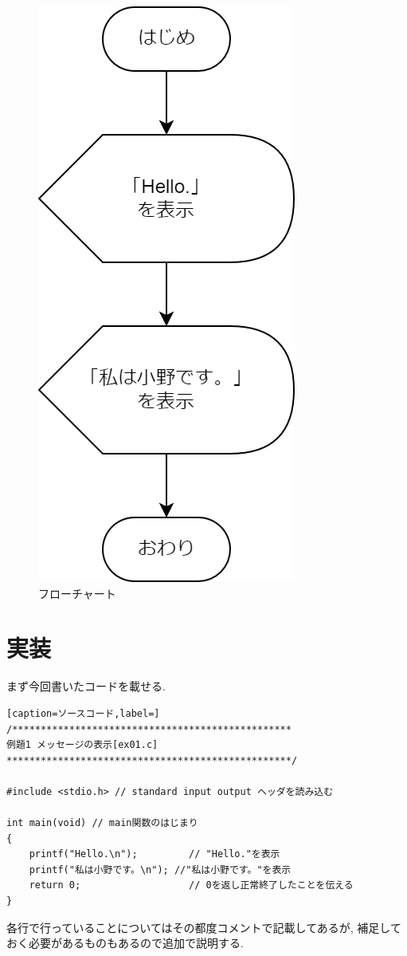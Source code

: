 \documentclass[a4paper, xelatex, ja=standard, 10.5pt]{bxjsarticle}
\begin{document}
\begin{figure}[H]
\centering
\includegraphics[scale=0.5]{img/flowchart.drawio.png}
\caption{フローチャート}
\label{}
\end{figure}

\section{実装}
まず今回書いたコードを載せる.
\begin{lstlisting}[caption=ソースコード,label=]
/*************************************************
例題1 メッセージの表示[ex01.c]
**************************************************/

#include <stdio.h> // standard input output ヘッダを読み込む

int main(void) // main関数のはじまり
{
    printf("Hello.\n");         // "Hello."を表示
    printf("私は小野です。\n"); //"私は小野です。"を表示
    return 0;                   // 0を返し正常終了したことを伝える
}
\end{lstlisting}
各行で行っていることについてはその都度コメントで記載してあるが,
補足しておく必要があるものもあるので追加で説明する.
\end{document}
